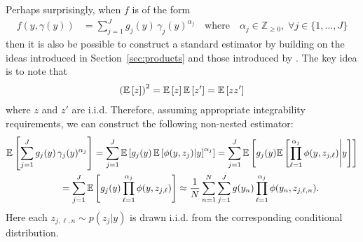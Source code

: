 Perhaps surprisingly, when $f$ is of the form
\begin{align}
  f(y,\gamma(y)) &= \sum_{j=1}^{J} g_j(y) \, \gamma_j(y)^{\alpha_j} \quad \text{where}
  \quad \alpha_j \in \mathbb{Z}_{\geq 0}, \; \forall j \in \{1,\dots,J\}
\end{align}
then it is also be possible to construct a standard \mc estimator by building on the ideas
introduced in Section~\ref{sec:products} and those introduced by \cite{goda2016computing}.
The key idea is to note that
\begin{align*}
\left(\mathbb{E} \left[z\right]\right)^2 = \mathbb{E} \left[z\right]\mathbb{E} \left[z'\right] = \mathbb{E} \left[z z'\right]
\end{align*}
where $z$ and $z'$ are i.i.d.  Therefore, assuming appropriate integrability requirements,
we can construct the following non-nested \mc estimator:
\begin{align}
\mathbb{E}\left[\sum_{j=1}^{J} g_j(y) \, \gamma_j(y)^{\alpha_j}\right] &= 
\sum_{j=1}^{J} \mathbb{E}\left[g_j(y) \, \mathbb{E}\left[\phi(y,z_{j}) | y\right]^{\alpha_j}\right]
=\sum_{j=1}^{J} \mathbb{E}\left[g_j(y) \mathbb{E}\left[\prod_{\ell=1}^{\alpha_j} \phi(y,z_{j,\ell}) \middle|y\right]\right] \nonumber \\
=\sum_{j=1}^{J} \mathbb{E}&\left[g_j(y)\prod_{\ell=1}^{\alpha_j} \phi(y,z_{j,\ell})\right]
\approx \frac{1}{N} \sum_{n=1}^{N} \sum_{j=1}^{J} g(y_n)\prod_{\ell=1}^{\alpha_j} \phi(y_n,z_{j,\ell,n}).
\end{align}
Here each $z_{j,\ell,n} \sim p(z_j | y)$ is drawn i.i.d. from the corresponding conditional distribution.
